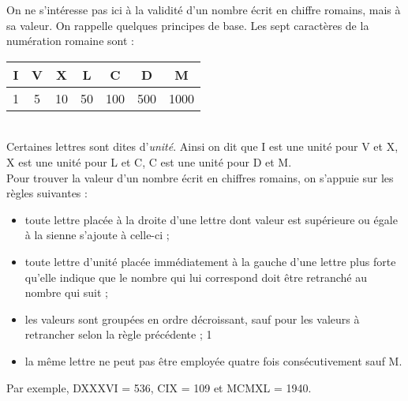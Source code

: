 On ne s'intéresse pas ici à la validité d'un nombre écrit en chiffre romains, mais à sa valeur. On rappelle
quelques principes de base. Les sept caractères de la numération romaine sont :\\

\begin{tabular}{|c|c|c|c|c|c|c|}
 \hline
 I&V&X&L&C&D&M\\ \hline
 1&5&10&50&100&500&1000\\ \hline
\end{tabular}\\

Certaines lettres sont dites d'\emph{unité}. Ainsi on dit que I est une unité pour V et X, X est une 
unité pour L et C, C est une unité pour D et M.\\

Pour trouver la valeur d'un nombre écrit en chiffres romains, on s'appuie sur les règles suivantes :
\begin{itemize}
\item toute lettre placée à la droite d'une lettre dont valeur est supérieure ou égale à la sienne s'ajoute
à celle-ci ;
\item toute lettre d'unité placée immédiatement à la gauche d'une lettre plus forte qu'elle indique que
le nombre qui lui correspond doit être retranché au nombre qui suit ;
\item les valeurs sont groupées en ordre décroissant, sauf pour les valeurs à retrancher selon la règle
précédente ;
1
\item la même lettre ne peut pas être employée quatre fois consécutivement sauf M.
\end{itemize}

Par exemple,  DXXXVI = 536, CIX = 109 et MCMXL = 1940.

